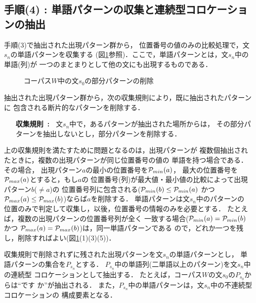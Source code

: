 \subsection*{手順(4) : 単語パターンの収集と連続型コロケーションの抽出}

手順(3)で抽出された出現パターン群から，
位置番号の値のみの比較処理で，文\hspace{-0.1mm}$s_n$\hspace{-0.1mm}の単語パターンを収集する
(図\ref{Fig:subpdel}参照)．ここで，単語パターンとは，文\hspace{-0.1mm}$s_n$\hspace{-0.1mm}中の単語(列)が
一つのまとまりとして他の文にも出現するものである．
\begin{figure}[hbt]
\begin{center}
\end{center}
\vspace{-3mm}
\caption{コーパス$W$中の文$s_0$の部分パターンの削除}
\label{Fig:subpdel}
\vspace{-2mm}
\end{figure}

抽出された出現パターン群から，次の収集規則により，既に抽出されたパターンに
包含される断片的なパターンを削除する．
\begin{itemize}
\item[{\bf 収集規則~:~}] 文$s_n$中で，あるパターンが抽出された場所からは，
その部分パターンを抽出しないとし，部分パターンを削除する．
\end{itemize}

上の収集規則を満たすために問題となるのは，出現パターンが
複数個抽出されたときに，複数の出現パターンが同じ位置番号の値の
単語を持つ場合である．その場合，
出現パターン$a$の最小の位置番号を${\cal P}_{min}(a)$，
最大の位置番号を${\cal P}_{max}(a)$とすると，もし$a$の
位置番号(列)が最大値・最小値の比較によって出現パターン$b$(\(\neq a\))の
位置番号列に包含される(\({\cal P}_{min}(b) \leq {\cal P}_{min}(a)\)
かつ\({\cal P}_{max}(a) \leq {\cal P}_{max}(b)\))ならば$a$を削除する．
単語パターンは文$s_n$中のパターンの
位置のみで判定して収集し，以後，位置番号の情報のみを必要とする．
たとえば，複数の出現パターンの位置番号列が全く
一致する場合(\({\cal P}_{min}(a)={\cal P}_{min}(b)\)かつ
\({\cal P}_{max}(a)={\cal P}_{max}(b)\))は，同一単語パターンである
ので，どれか一つを残し，削除すればよい(図\ref{Fig:subpdel}(1)(3)(5))．

収集規則で削除されずに残された出現パターンを文$s_n$の単語パターンとし，
単語パターンの集合を$P_{s_n}$とする．
$P_{s_n}$中の単語列(二単語以上のパターン)を文$s_n$中の連続型
コロケーションとして抽出する．
たとえば，コーパス$W$の文$s_0$の\hspace{-0.1mm}$P_{s_0}$\hspace{-0.1mm}からは``です か''が抽出される．
また，$P_{s_n}$中の単語パターンは，文$s_n$中の不連続型コロケーションの
構成要素となる．

